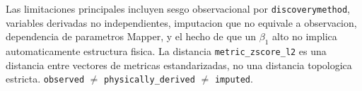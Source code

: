 Las limitaciones principales incluyen sesgo observacional por \texttt{discoverymethod}, variables derivadas no independientes, imputacion que no equivale a observacion, dependencia de parametros Mapper, y el hecho de que un \(\beta_1\) alto no implica automaticamente estructura fisica. La distancia \texttt{metric\_zscore\_l2} es una distancia entre vectores de metricas estandarizadas, no una distancia topologica estricta. \texttt{observed} \(\neq\) \texttt{physically\_derived} \(\neq\) \texttt{imputed}. %

